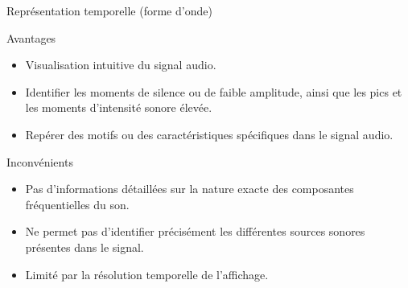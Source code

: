\documentclass[compress,xcolor=table]{beamer}
\begin{document}
\begin{frame}{Représentation temporelle (forme d'onde)}

    \begin{block}{Avantages}
        \begin{itemize}
            \item Visualisation intuitive du signal audio. %
            \item Identifier les moments de silence ou de faible amplitude, ainsi que les pics et les moments d'intensité sonore élevée.
            \item Repérer des motifs ou des caractéristiques spécifiques dans le signal audio.
        \end{itemize}
    \end{block}

    \begin{alertblock}{Inconvénients}
        \begin{itemize}
            \item Pas d'informations détaillées sur la nature exacte des composantes fréquentielles du son.
            \item Ne permet pas d'identifier précisément les différentes sources sonores présentes dans le signal.
            \item Limité par la résolution temporelle de l'affichage. %
        \end{itemize}
    \end{alertblock}

\end{frame}
\end{document}
